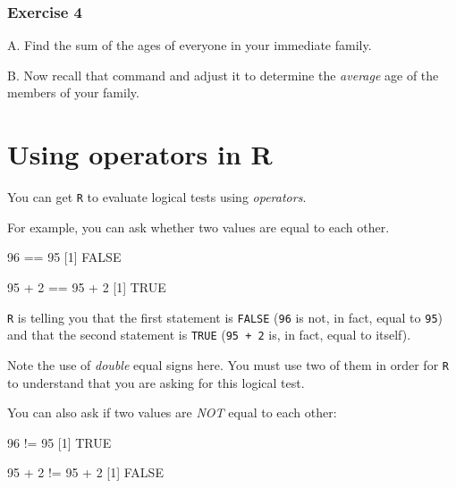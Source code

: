 \documentclass[
]{book}
\newenvironment{Shaded}{\begin{snugshade}}{\end{snugshade}}
\newcommand{\ConstantTok}[1]{\textcolor[rgb]{0.00,0.00,0.00}{#1}}
\newcommand{\DecValTok}[1]{\textcolor[rgb]{0.00,0.00,0.81}{#1}}
\newcommand{\NormalTok}[1]{#1}
\newcommand{\SpecialCharTok}[1]{\textcolor[rgb]{0.00,0.00,0.00}{#1}}
\begin{document}
\hypertarget{exercise-4}{%
\subsubsection*{Exercise 4}\label{exercise-4}}

A. Find the sum of the ages of everyone in your immediate family.

B. Now recall that command and adjust it to determine the \emph{average} age of the members of your family.

\hypertarget{using-operators-in-r}{%
\section*{Using operators in R}\label{using-operators-in-r}}

You can get \texttt{R} to evaluate logical tests using \emph{operators}.

For example, you can ask whether two values are equal to each other.

\begin{Shaded}
\begin{Highlighting}[]
\DecValTok{96} \SpecialCharTok{==} \DecValTok{95}
\NormalTok{[}\DecValTok{1}\NormalTok{] }\ConstantTok{FALSE}

\DecValTok{95} \SpecialCharTok{+} \DecValTok{2} \SpecialCharTok{==} \DecValTok{95} \SpecialCharTok{+} \DecValTok{2}
\NormalTok{[}\DecValTok{1}\NormalTok{] }\ConstantTok{TRUE}
\end{Highlighting}
\end{Shaded}

\texttt{R} is telling you that the first statement is \texttt{FALSE} (\texttt{96} is not, in fact, equal to \texttt{95}) and that the second statement is \texttt{TRUE} (\texttt{95\ +\ 2} is, in fact, equal to itself).

Note the use of \emph{double} equal signs here. You must use two of them in order for \texttt{R} to understand that you are asking for this logical test.

You can also ask if two values are \emph{NOT} equal to each other:

\begin{Shaded}
\begin{Highlighting}[]
\DecValTok{96} \SpecialCharTok{!=} \DecValTok{95}
\NormalTok{[}\DecValTok{1}\NormalTok{] }\ConstantTok{TRUE}

\DecValTok{95} \SpecialCharTok{+} \DecValTok{2} \SpecialCharTok{!=} \DecValTok{95} \SpecialCharTok{+} \DecValTok{2}
\NormalTok{[}\DecValTok{1}\NormalTok{] }\ConstantTok{FALSE}
\end{Highlighting}
\end{Shaded}
\end{document}

